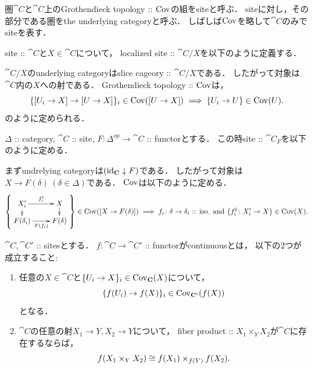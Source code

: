 \documentclass[a4paper]{jsarticle}
\begin{document}
\begin{Def}[Site]
    圏$\cat{C}$と$\cat{C}$上のGrothendieck topology :: $\Cov$の組をsiteと呼ぶ．
    siteに対し，その部分である圏をthe underlying categoryと呼ぶ．
    しばしば$\Cov$を略して$\cat{C}$のみでsiteを表す．
\end{Def}

\begin{Def}
    site :: $\cat{C}$と$X \in \cat{C}$について，
    localized site :: $\cat{C}/X$を以下のように定義する．

    $\cat{C}/X$のunderlying categoryはslice cageory :: $\cat{C}/X$である．
    したがって対象は$\cat{C}$内の$X$への射である．
    Grothendieck topology :: $\Cov$は，
    \[
        \{ [U_i \to X] \to [U \to X] \}_i \in \Cov([U \to X])
        \implies \{U_i \to U\} \in \Cov(U).
    \]
    のように定められる．
\end{Def}

\begin{Def}
    $\Delta$ :: category, $\cat{C}$ :: site, 
    $F \colon \Delta^{op} \to \cat{C}$ :: functorとする．
    この時site :: $\cat{C}_F$を以下のように定める．

    まずundrelying categoryは$(\id[\cat{C}] \downarrow F)$である．
    したがって対象は$X \to F(\delta) \ (\delta \in \Delta)$である．
    $\Cov$は以下のように定める．
    \[
        \left\{
        \vcenter{
        \xymatrix@R=8pt{
            X'_i \ar[d]\ar[r]^-{f_i^{\flat}}& X \ar[d]\\
            F(\delta_i) \ar[r]_-{F(f_i)}& F(\delta)
        }}
        \right\} \in \Cov([X \to F(\delta)])
        \implies
        f_i \colon \delta \to \delta_i \text{ :: iso. and }
        \{f_i^{\flat} \colon X'_i \to X \} \in \Cov(X).
    \]
\end{Def}

\begin{Def}
    $\cat{C}, \cat{C}'$ :: sitesとする．
    $f \colon \cat{C} \to \cat{C}'$ :: functorがcontinuousとは，
    以下の$2$つが成立すること:
    \begin{enumerate}
        \item 
        任意の$X \in \cat{C}$と$\{U_i \to X\}_i \in \Cov_{\cat{C}}(X)$について，
        \[ \{ f(U_i) \to f(X) \}_i \in \Cov_{\cat{C}'}(f(X)) \]となる．

        \item
        $\cat{C}$の任意の射$X_1 \to Y, X_2 \to Y$について，
        fiber product :: $X_1 \times_Y X_2$が$\cat{C}$に存在するならば，
        \[ f(X_1 \times_Y X_2) \iso f(X_1) \times_{f(Y)} f(X_2). \]
    \end{enumerate}
\end{Def}
\end{document}
